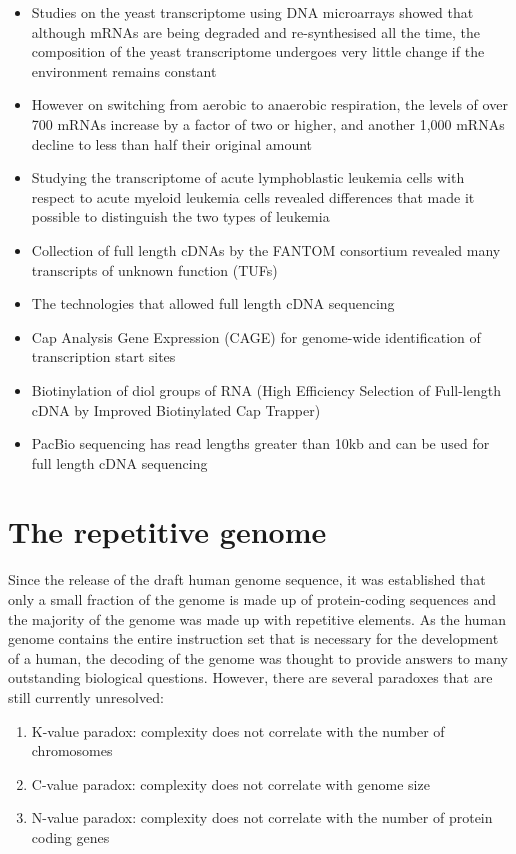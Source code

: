 \begin{itemize}

   \item Studies on the yeast transcriptome using DNA microarrays showed that although mRNAs are being degraded and re-synthesised all the time, the composition of the yeast transcriptome undergoes very little change if the environment remains constant
   \item However on switching from aerobic to anaerobic respiration, the levels of over 700 mRNAs increase by a factor of two or higher, and another 1,000 mRNAs decline to less than half their original amount
   \item Studying the transcriptome of acute lymphoblastic leukemia cells with respect to acute myeloid leukemia cells revealed differences that made it possible to distinguish the two types of leukemia
   \item Collection of full length cDNAs by the FANTOM consortium revealed many transcripts of unknown function (TUFs)
   \item The technologies that allowed full length cDNA sequencing
   \item Cap Analysis Gene Expression (CAGE) for genome-wide identification of transcription start sites
   \item Biotinylation of diol groups of RNA (High Efficiency Selection of Full-length cDNA by Improved Biotinylated Cap Trapper)
   \item PacBio sequencing has read lengths greater than 10kb and can be used for full length cDNA sequencing

\end{itemize}

\section{The repetitive genome}

Since the release of the draft human genome sequence\cite{venter2001sequence, lander2001initial}, it was established that only a small fraction of the genome is made up of protein-coding sequences and the majority of the genome was made up with repetitive elements. As the human genome contains the entire instruction set that is necessary for the development of a human, the decoding of the genome was thought to provide answers to many outstanding biological questions. However, there are several paradoxes that are still currently unresolved:

\begin{enumerate}
   \item K-value paradox: complexity does not correlate with the number of chromosomes
   \item C-value paradox: complexity does not correlate with genome size
   \item N-value paradox: complexity does not correlate with the number of protein coding genes
\end{enumerate}

